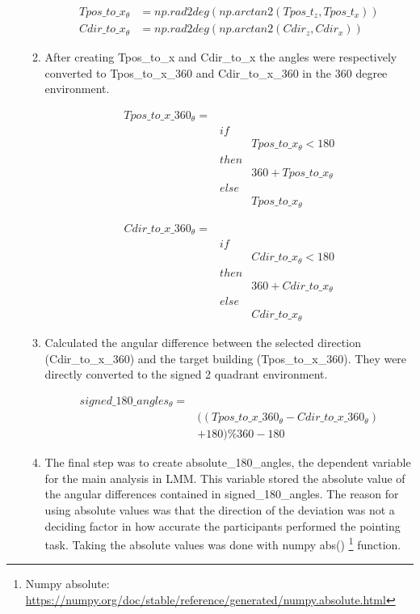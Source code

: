\begin{enumerate}
\begin{enumerate}
		\begin{align*}
			Tpos\_to\_x_{\theta} & = np.rad2deg(np.arctan2(Tpos\_t_{z}, Tpos\_t_{x})) \\
			Cdir\_to\_x_{\theta} & = np.rad2deg(np.arctan2(Cdir_{z}, Cdir_{x}))
		\end{align*}
		
		\item After creating {\emphasize Tpos\_to\_x} and {\emphasize Cdir\_to\_x} the angles were respectively converted to {\emphasize Tpos\_to\_x\_360} and {\emphasize Cdir\_to\_x\_360} in the 360 degree environment.

		\begin{align*}
			Tpos\_to\_x\_360_{\theta} = & \\
			& if & \\
			&& Tpos\_to\_x_{\theta} < 180 \\
			& then & \\
			&& 360 + Tpos\_to\_x_{\theta} \\
			& else & \\
			&& Tpos\_to\_x_{\theta}
		\end{align*}
	
		\begin{align*}
			Cdir\_to\_x\_360_{\theta} = & \\
			& if & \\
			&& Cdir\_to\_x_{\theta} < 180 \\
			& then & \\
			&& 360 + Cdir\_to\_x_{\theta} \\
			& else & \\
			&& Cdir\_to\_x_{\theta}
		\end{align*}
		
		\item Calculated the angular difference between the selected direction {\emphasize (Cdir\_to\_x\_360)} and the target building {\emphasize (Tpos\_to\_x\_360)}. They were directly converted to the signed 2 quadrant environment.
		
			\begin{align*}
				signed\_180\_angles_{\theta} = & \\
				& ((Tpos\_to\_x\_360_{\theta} - Cdir\_to\_x\_360_{\theta}) \\
				& + 180) \% 360 - 180
			\end{align*}
		
	
		\item The final step was to create {\emphasize absolute\_180\_angles}, the dependent variable for the main analysis in LMM. This variable stored the absolute value of the angular differences contained in {\emphasize signed\_180\_angles}. The reason for using absolute values was that the direction of the deviation was not a deciding factor in how accurate the participants performed the pointing task. Taking the absolute values was done with numpy abs() \footnote{Numpy absolute: \href{https://numpy.org/doc/stable/reference/generated/numpy.absolute.html}{https://numpy.org/doc/stable/reference/generated/numpy.absolute.html}} function.
		

\end{enumerate}
\end{enumerate}
